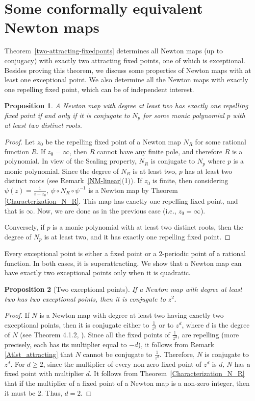 \documentclass[12pt]{article}
\newtheorem{prop}{Proposition}[section]
\numberwithin{equation}{section}
\begin{document}
\section{Some conformally equivalent Newton maps}\label{Sec3_conf_equiv}
Theorem~\ref{two-attracting-fixedponts} determines all Newton maps (up to conjugacy) with exactly two attracting fixed points, one of which is exceptional. Besides proving this theorem, we discuss some properties of Newton maps with at least one exceptional point. We also determine all the Newton maps with exactly one repelling fixed point, which can be of independent interest.
\begin{prop} 
	A Newton map with degree at least two has exactly one repelling fixed point if and only if it is conjugate to $N_{p}$ for some monic polynomial $p$ with at least two distinct roots. 
	\label{conj_to_poly}
\end{prop}
\begin{proof}
Let $z_0$ be the repelling fixed point of a Newton map $ N_{R}$ for some rational function $R$. If $z_0 = \infty $, then $R$ cannot have any finite pole, and therefore $R$ is a polynomial. In view of the Scaling property, $N_R$ is conjugate to $N_p$ where $p$ is a monic polynomial. Since the degree of $N_R$ is at least two, $p$ has at least two distinct roots (see Remark~\ref{NM-linear}(1)). If $z_0 $ is finite, then considering  $\psi(z) =\frac{1}{z-z_0}$,  $\psi \circ N_R \circ \psi^{-1}$ is a Newton map by Theorem \ref{Characterization_N_R}. This map has exactly one repelling fixed point, and that is $\infty$. Now, we are done as in the previous case (i.e., $z_0 = \infty$).

\par 
Conversely, if $p$ is a monic polynomial with at least two distinct roots, then the degree of $N_p$ is at least two, and it has exactly one repelling fixed point.
\end{proof}
Every exceptional point is either a fixed point or a $2$-periodic point of a rational function. In both cases, it is superattracting. We show that a Newton map can have exactly two exceptional points only when it is quadratic. 
\begin{prop}[Two exceptional points]\label{two_exp}
	If a Newton map with degree at least two has two exceptional points, then it is  conjugate to $z^2$.
	\label{quadratic-newton}
\end{prop}
\begin{proof}
	If $N$ is a Newton map with degree at least two having exactly two exceptional points, then it is conjugate either to $\frac{1}{z^d}$ or to $z^d$, where $d$ is the degree of $N$ (see Theorem 4.1.2, \cite{Beardon_book}). Since all the fixed points of  $\frac{1}{z^d}$, are repelling (more precisely, each has its multiplier equal to $-d$), it follows from Remark \ref{Atlst_attracting} that $N$ cannot be conjugate to $\frac{1}{z^d}$. Therefore, $N$ is conjugate to $z^d$. For $d \geq 2$, since the multiplier of every non-zero fixed point of $z^d$ is $d$, $N$ has a fixed point with multiplier $d$. It follows from  Theorem~\ref{Characterization_N_R} that if the multiplier of a fixed point of a Newton map is a non-zero integer, then it must be $2$. Thus,  $d= 2$. 
\end{proof}
\end{document}

